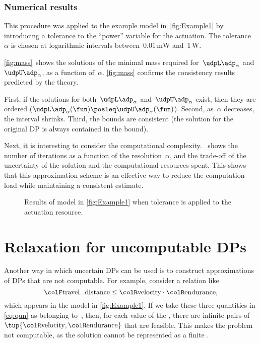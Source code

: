 \subsubsection{Numerical results}

This procedure was applied to the example model in~\cref{fig:Example1} by introducing a tolerance to the ``power'' variable for the actuation.
The tolerance~$\alpha$ is chosen at logarithmic intervals between~$0.01\,\text{mW}$ and~$1\,\text{W}$.

\cref{fig:mass}~shows the solutions of the minimal mass required for~$\udpL\adp_{\alpha}$ and~$\udpU\adp_{\alpha}$, as a function of~$\alpha$. \cref{fig:mass} confirms the consistency results predicted by the theory.

First, if the solutions for both~$\udpL\adp_{\alpha}$ and~$\udpU\adp_{\alpha}$ exist, then they are ordered ($\udpL\adp_{\alpha}(\fun)\posleq\udpU\adp_{\alpha}(\fun)$).
Second, as~$\alpha$ decreases, the interval shrinks.
Third, the bounds are consistent (the solution for the original DP is always contained in the bound).

Next, it is interesting to consider the computational complexity.
~shows the number of iterations as a function of the resolution~$\alpha$, and the trade-off of the uncertainty of the solution and the computational resources spent.
This shows that this approximation scheme is an effective way to reduce the computation load while maintaining a consistent estimate.

\vfill
\begin{figure}[h]
    \caption{
        Results of model in \cref{fig:Example1} when tolerance is applied to the actuation  resource.
    }
\end{figure}

\section[Uncomputable DPs]{Relaxation for uncomputable DPs}
\label{sec:Application-relax}

Another way in which uncertain DPs can be used is to construct approximations of DPs that are not computable.
For example, consider a relation like
%
\begin{equation}
    \label{eq:qun}
    {\colF\text{travel\_distance}}
    \leq{\colR\text{velocity}}\cdot{\colR\text{endurance}},
\end{equation}
%
which appears in the model in \cref{fig:Example1}.
If we take these three quantities in \cref{eq:qun} as belonging to~\reals, then, for each value of the , there are infinite pairs of~$\tup{{\colR\text{velocity}},{\colR\text{endurance}}} $ that are feasible.
This makes the problem not computable, as the solution cannot be represented as a finite .

